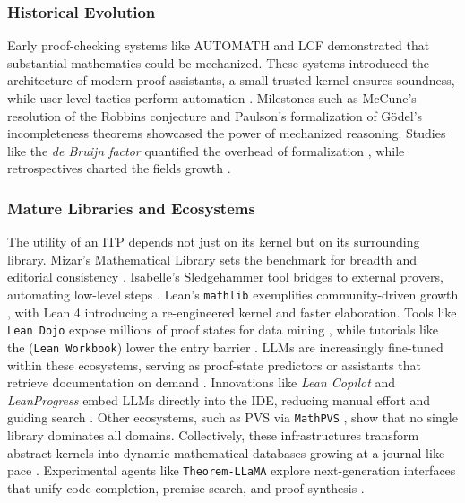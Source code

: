 \documentclass[acmsmall,anonymous]{acmart}
\begin{document}
\subsubsection{Historical Evolution}\label{sec:history}
Early proof-checking systems like AUTOMATH and LCF demonstrated that substantial mathematics could be mechanized. These systems introduced the architecture of modern proof assistants, a small trusted kernel ensures soundness, while user level tactics perform automation \cite{paulson1986natural,paulson1988preliminary}.  Milestones such as McCune’s resolution of the Robbins conjecture \cite{mccune1997solution} and Paulson’s formalization of Gödel’s incompleteness theorems \cite{paulson2013godel} showcased the power of mechanized reasoning.  Studies like the \emph{de Bruijn factor} quantified the overhead of formalization \cite{wiedijk2012de}, while retrospectives charted the fields growth \cite{debruijn1994survey,harrison2014history}.

\subsubsection{Mature Libraries and Ecosystems}\label{sec:libraries}
The utility of an ITP depends not just on its kernel but on its surrounding library. Mizar's Mathematical Library sets the benchmark for breadth and editorial consistency \cite{bancerek2018role}. Isabelle's Sledgehammer tool bridges to external provers, automating low-level steps \cite{bohme2010sledgehammer}.  Lean’s \texttt{mathlib} exemplifies community-driven growth \cite{moura2021lean,mathlib4}, with Lean 4 introducing a re-engineered kernel and faster elaboration.  Tools like \texttt{Lean Dojo} expose millions of proof states for data mining \cite{yang-2023-leandojo}, while tutorials like the (\texttt{Lean Workbook}) lower the entry barrier \cite{ying2024leanworkbook,ying2024leanworkbook}.  LLMs are increasingly fine-tuned within these ecosystems, serving as proof-state predictors \cite{li2023aiformathematics,li2024leanreasoner} or assistants that retrieve documentation on demand \cite{song2024towards}. Innovations like \emph{Lean Copilot} and \emph{LeanProgress} embed LLMs directly into the IDE, reducing manual effort and guiding search \cite{huang2024leancopilot, huang2025leanprogress}. Other ecosystems, such as PVS via \texttt{MathPVS} \cite{saidi2023mathPVS}, show that no single library dominates all domains. Collectively, these infrastructures transform abstract kernels into dynamic mathematical databases growing at a journal-like pace \cite{massot2023mathematics}.  Experimental agents like \texttt{Theorem‐LLaMA} explore next-generation interfaces that unify code completion, premise search, and proof synthesis \cite{gu2024theoremllama}.
\end{document}
